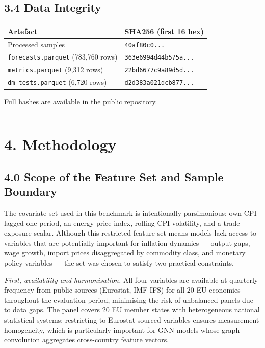 \documentclass[
]{article}
\newcounter{none} %
\begin{document}
\subsection{3.4 Data Integrity}\label{data-integrity}

{\def\LTcaptype{none} %
\begin{longtable}[]{@{}ll@{}}
\toprule\noalign{}
Artefact & SHA256 (first 16 hex) \\
\midrule\noalign{}
\endhead
\bottomrule\noalign{}
\endlastfoot
Processed samples & \texttt{40af80c0...} \\
\texttt{forecasts.parquet} (783,760 rows) & \texttt{363e6994d44b575a...} \\
\texttt{metrics.parquet} (9,312 rows) & \texttt{22bd6677c9a89d5d...} \\
\texttt{dm\_tests.parquet} (6,720 rows) & \texttt{d2d383a021dcb877...} \\
\end{longtable}
}

Full hashes are available in the public repository.

\begin{center}\rule{0.5\linewidth}{0.5pt}\end{center}

\section{4. Methodology}\label{methodology}

\subsection{4.0 Scope of the Feature Set and Sample Boundary}\label{scope-of-the-feature-set-and-sample-boundary}

The covariate set used in this benchmark is intentionally parsimonious: own CPI lagged one period, an energy price index, rolling CPI volatility, and a trade-exposure scalar. Although this restricted feature set means models lack access to variables that are potentially important for inflation dynamics --- output gaps, wage growth, import prices disaggregated by commodity class, and monetary policy variables --- the set was chosen to satisfy two practical constraints.

\emph{First, availability and harmonisation.} All four variables are available at quarterly frequency from public sources (Eurostat, IMF IFS) for all 20 EU economies throughout the evaluation period, minimising the risk of unbalanced panels due to data gaps. The panel covers 20 EU member states with heterogeneous national statistical systems; restricting to Eurostat-sourced variables ensures measurement homogeneity, which is particularly important for GNN models whose graph convolution aggregates cross-country feature vectors.
\end{document}
